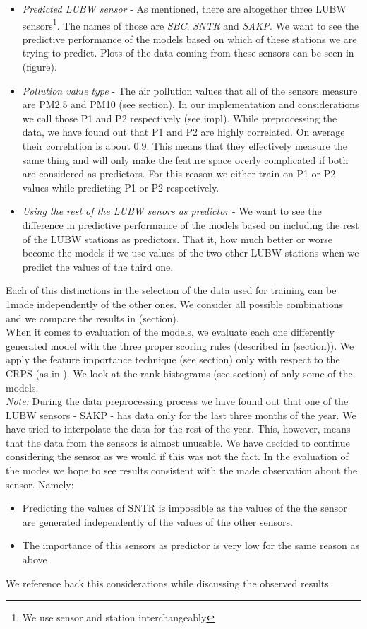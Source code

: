 \documentclass[12pt,a4paper,twoside]{scrartcl}
\numberwithin{equation}{section}
\begin{document}
\begin{itemize}
\item \emph{Predicted LUBW sensor} - As mentioned, there are altogether three LUBW sensors\footnote{We use sensor and station interchangeably}. The names of those are \emph{SBC}, \emph{SNTR} and \emph{SAKP}. We want to see the predictive performance of the models based on which of these stations we are trying to predict. Plots of the data coming from these sensors can be seen in (figure).
\item \emph{Pollution value type} - The air pollution values that all of the sensors measure are PM2.5 and PM10 (see section). In our implementation and considerations we call those P1 and P2 respectively (see impl). While preprocessing the data, we have found out that P1 and P2 are highly correlated. On average their correlation is about \(0.9 \). This means that they effectively measure the same thing and will only make the feature space overly complicated if both are considered as predictors. For this reason we either train on P1 or P2 values while predicting P1 or P2 respectively.
\item \emph{Using the rest of the LUBW senors as predictor} -  We want to see the difference in predictive performance of the models based on including the rest of the LUBW stations as predictors. That it, how much better or worse become the models if we use values of the two other LUBW stations when we predict the values of the third one.
\end{itemize}
Each of this distinctions in the selection of the data used for training can be 1made independently of the other ones. We consider all possible combinations and we compare the results in (section).
\\
When it comes to evaluation of the models, we evaluate each one differently generated model with the three proper scoring rules (described in (section)). We apply the feature importance technique (see section) only with respect to the CRPS (as in \cite{lerch2018}). We look at the rank histograms (see section) of only some of the models.
\\
\emph{Note:} During the data preprocessing process we have found out that one of the LUBW sensors - SAKP  - has data only for the last three months of the year. We have tried to interpolate the data for the rest of the year. This, however, means that the data from the sensors is almost unusable. We have decided to continue considering the sensor as we would if this was not the fact. In the evaluation of the modes we hope to see results consistent with the made observation about the sensor. Namely:
\begin{itemize}
\item Predicting the values of SNTR is impossible as the values of the the sensor are generated independently of the values of the other sensors.
\item The importance of this sensors as predictor is very low for the same reason as above
\end{itemize}
We reference back this considerations while discussing the observed results.
\end{document}
